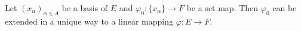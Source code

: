 Let $(x_\alpha)_{\alpha \in A}$ be a basis of $E$ and $\varphi_0 : \{x_\alpha\} \rightarrow F$ be a set map. Then $\varphi_0$ can be extended in a unique way to a linear mapping $\varphi : E \rightarrow F$.
